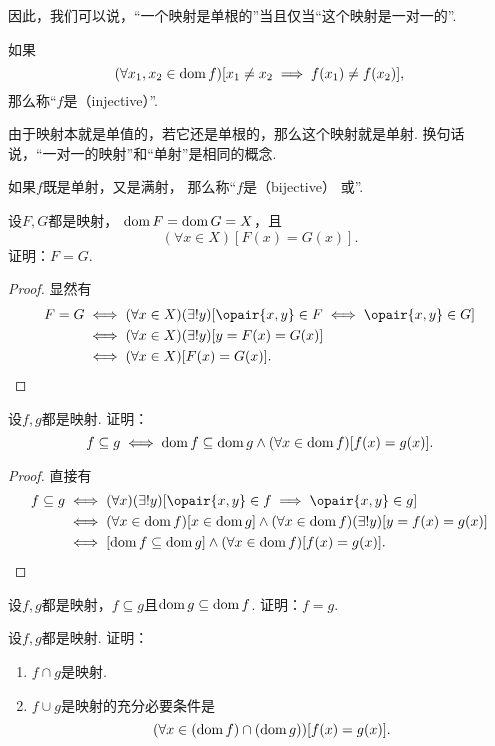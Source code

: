 因此，我们可以说，“一个映射是单根的”当且仅当“这个映射是一对一的”.

如果\[
	(\forall x_1, x_2 \in \operatorname{dom} f)
	[x_1 \neq x_2 \implies f(x_1) \neq f(x_2)],
\]
那么称“\(f\)是（injective）”.

由于映射本就是单值的，若它还是单根的，那么这个映射就是单射.
换句话说，“一对一的映射”和“单射”是相同的概念.

如果\(f\)既是单射，又是满射，
那么称“\(f\)是（bijective）
或”.

\begin{example}
设\(F,G\)都是映射，
\(\operatorname{dom} F = \operatorname{dom} G = X\)，且\[
	(\forall x \in X)[F(x) = G(x)].
\]
证明：\(F=G\).
\begin{proof}
显然有
\begin{align*}
	F=G
	&\iff (\forall x \in X)(\exists!y)[
		\opair{x,y} \in F
		\iff
		\opair{x,y} \in G
	] \\
	&\iff (\forall x \in X)(\exists!y)[
		y = F(x) = G(x)
	] \\
	&\iff (\forall x \in X)[F(x) = G(x)].
	\qedhere
\end{align*}
\end{proof}
\end{example}

\begin{example}
设\(f,g\)都是映射.
证明：\[
	f \subseteq g
	\iff
	\operatorname{dom} f \subseteq \operatorname{dom} g
	\land
	(\forall x \in \operatorname{dom} f)
	[f(x) = g(x)].
\]
\begin{proof}
直接有
\begin{align*}
	f \subseteq g
	&\iff (\forall x)(\exists!y)[\opair{x,y} \in f \implies \opair{x,y} \in g] \\
	&\iff (\forall x \in \dom f)[x \in \dom g]\land(\forall x \in \dom f)(\exists!y)[y=f(x)=g(x)] \\
	&\iff [\dom f \subseteq \dom g]\land(\forall x \in \dom f)[f(x)=g(x)].
	\qedhere
\end{align*}
\end{proof}
\end{example}

\begin{example}
设\(f,g\)都是映射，\(f \subseteq g\)且\(\operatorname{dom} g \subseteq \operatorname{dom} f\).
证明：\(f=g\).
\end{example}

\begin{example}
设\(f,g\)都是映射.
证明：
\begin{enumerate}
	\item \(f \cap g\)是映射.
	\item \(f \cup g\)是映射的充分必要条件是\[
		(\forall x \in (\operatorname{dom} f)\cap(\operatorname{dom} g))[f(x)=g(x)].
	\]
\end{enumerate}
\end{example}

